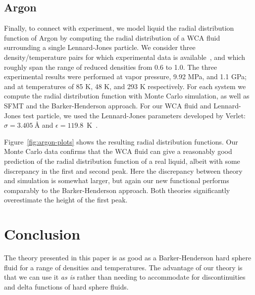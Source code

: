 \documentclass[letterpaper,twocolumn,amsmath,amssymb,prb]{revtex4-1}
\begin{document}
\subsection{Argon}

Finally, to connect with experiment, we model liquid the radial
distribution function of Argon by computing the radial distribution of
a WCA fluid surrounding a single Lennard-Jones particle.  We consider
three density/temperature pairs for which experimental data is
available~\cite{mikolaj2004structure, eggert2002quantitative,
yarnell1973structure}, and which roughly span the range of reduced
densities from 0.6 to 1.0. The three experimental results were
performed at vapor pressure, 9.92 MPa, and 1.1 GPa; and at
temperatures of 85 K, 48 K, and 293 K respectively. For each system we
compute the radial distribution function with Monte Carlo simulation,
as well as SFMT and the Barker-Henderson approach.  For our WCA fluid
and Lennard-Jones test particle, we used the Lennard-Jones parameters
developed by Verlet: $\sigma = 3.405 ~\textrm{\AA}$ and $\epsilon =
119.8$~K~\cite{verlet1967computer}.

Figure~\ref{fig:argon-plots} shows the resulting radial distribution
functions.  Our Monte Carlo data confirms that the WCA fluid can give
a reasonably good prediction of the radial distribution function of a
real liquid, albeit with some discrepancy in the first and second
peak.  Here the discrepancy between theory and simulation is somewhat
larger, but again our new functional performs comparably to the
Barker-Henderson approach.  Both theories significantly overestimate
the height of the first peak.
\section{Conclusion}

The theory presented in this paper is as good as a Barker-Henderson
hard sphere fluid for a range of densities and temperatures. The
advantage of our theory is that we can use it \emph{as is} rather than
needing to accommodate for discontinuities and delta functions of hard
sphere fluids.

 
\end{document}
